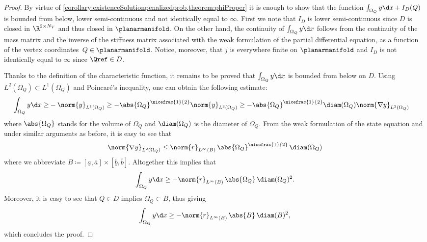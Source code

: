 \begin{proof}
	By virtue of \cref{corollary:existenceSolutionpenalizedprob,theorem:phiProper} it is enough to show that the function $\int_{\Omega_Q} y \d x + I_D(Q)$ is bounded from below, lower semi-continuous and not identically equal to $\infty$.
	First we note that $I_D$ is lower semi-continuous since $D$ is closed in $\R^{2 \times N_V}$ and thus closed in $\planarmanifold$.
	On the other hand, the continuity of $\int_{\Omega_Q} y \d x$ follows from the continuity of the mass matrix and the inverse of the stiffness matrix associated with the weak formulation of the partial differential equation, as a function of the vertex coordinates~$Q \in \planarmanifold$.
	Notice, moreover, that $j$ is everywhere finite on $\planarmanifold$ and $I_D$ is not identically equal to $\infty$ since $\Qref \in D$.

	Thanks to the definition of the characteristic function, it remains to be proved that $\int_{\Omega_Q} y \d x$ is bounded from below on $D$.
	Using $L^2(\Omega_Q) \subset L^1(\Omega_Q)$ and Poincaré's inequality, one can obtain the following estimate:
	\begin{align*}
		\int_{\Omega_Q} y \d x
		\ge
		&
		- \norm{y}_{L^1(\Omega_Q)}
		\ge
		- \abs{\Omega_Q}^{\nicefrac{1}{2}} \norm{y}_{L^2(\Omega_Q)}
		\ge
		- \abs{\Omega_Q}^{\nicefrac{1}{2}} \diam(\Omega_Q) \norm{\nabla y}_{L^2(\Omega_Q)}
	\end{align*}
	where $\abs{\Omega_Q}$ stands for the volume of $\Omega_Q$ and $\diam(\Omega_Q)$ is the diameter of $\Omega_Q$.
	From the weak formulation of the state equation and under similar arguments as before, it is easy to see that
	\begin{equation*}
		\norm{\nabla y}_{L^2(\Omega_Q)}
		\le
		\norm{r}_{L^\infty(B)}
		\,
		\abs{\Omega_Q}^{\nicefrac{1}{2}}
		\,
		\diam(\Omega_Q)
	\end{equation*}
	where we abbreviate $B \coloneqq [\underline{a},\overline{a}]\times[\underline{b},\overline{b}]$.
	Altogether this implies that
	\begin{equation*}
		\int_{\Omega_Q} y \d x
		\ge
		- \norm{r}_{L^\infty(B)}
		\,
		\abs{\Omega_Q}
		\,
		\diam(\Omega_Q)^2
		.
	\end{equation*}
	Moreover, it is easy to see that $Q\in D$ implies $\Omega_Q \subset B$, thus giving
	\begin{equation*}
		\int_{\Omega_Q} y \d x
		\ge
		- \norm{r}_{L^\infty(B)}
		\,
		\abs{B}
		\,
		\diam(B)^2
		,
	\end{equation*}
	which concludes the proof.
\end{proof}

